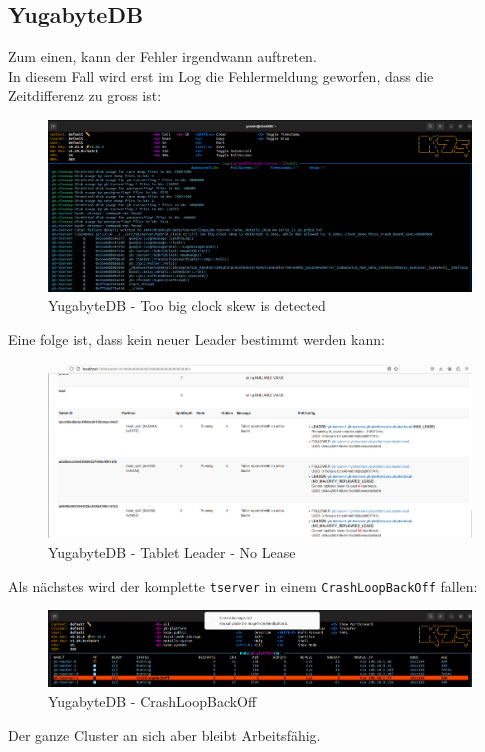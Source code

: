
\begin{flushleft}
    \subsection{YugabyteDB}
    \label{subsec:appendix_testing_yugabytedb}
    Zum einen, kann der Fehler irgendwann auftreten.\\
    In diesem Fall wird erst im Log die Fehlermeldung geworfen, dass die Zeitdifferenz zu gross ist:
    \begin{figure}[H]
        \centering
        \includegraphics[width=1\linewidth]{source/appendix/evaluation_testing/yugabytedb_too_big_clock_skew_is_detected}
        \caption{YugabyteDB - Too big clock skew is detected}
        \label{fig:yugabytedb_too_big_clock_skew_is_detected}
    \end{figure}
    Eine folge ist, dass kein neuer Leader bestimmt werden kann:
    \begin{figure}[H]
        \centering
        \includegraphics[width=1\linewidth]{source/appendix/evaluation_testing/yugabytedb_tablet_leader_lease}
        \caption{YugabyteDB - Tablet Leader - No Lease}
        \label{fig:yugabytedb_tablet_leader_lease}
    \end{figure}
    Als nächstes wird der komplette \texttt{tserver} in einem \texttt{CrashLoopBackOff} fallen:
    \begin{figure}[H]
        \centering
        \includegraphics[width=1\linewidth]{source/appendix/evaluation_testing/yugabytedb_crashloopbackoff}
        \caption{YugabyteDB - CrashLoopBackOff}
        \label{fig:yugabytedb_crashloopbackoff}
    \end{figure}
    Der ganze Cluster an sich aber bleibt Arbeitsfähig.
\end{flushleft}
